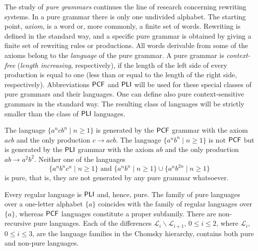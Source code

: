 The study of \emph{pure grammars} continues the line of research concerning rewriting systems. In a pure grammar there is only one undivided alphabet. The starting point, \emph{axiom}, is a word or, more commonly, a finite set of words. Rewriting is defined in the standard way, and a specific pure grammar is obtained by giving a finite set of rewriting rules or productions. All words derivable from some of the axioms belong to the \emph{language} of the pure grammar. A pure grammar is \emph{context-free} (\emph{length increasing}, respectively), if the length of the left side of every production is equal to one (less than or equal to the length of the right side, respectively). Abbreviations \index{$\PCF$}$\PCF$ and \index{$\PLI$}$\PLI$ will be used for these special classes of pure grammars and their languages. One can define also  pure context-sensitive grammars in the standard way. The resulting class of languages will be strictly smaller than the class of $\PLI$ languages.

The language $\{a^n c b^n \mid n \ge 1\}$ is generated by the $\PCF$ grammar with the axiom $acb$ and the only production $c \to acb$. The language $\{a^n b^n \mid n \ge 1\}$ is not $\PCF$ but is generated by the $\PLI$ grammar with the axiom $ab$ and the only production $ab \to a^2 b^2$. Neither one of the languages
$$\{a^n b^n c^n \mid n \ge 1\} \text{ and } \{a^n b^n \mid n \ge 1\} \cup \{a^n b^{2n} \mid n \ge 1\}$$
is pure, that is, they are not generated by any pure grammar whatsoever.

Every regular language is $\PLI$ and, hence, pure. The family of pure languages over a one-letter alphabet $\{a\}$ coincides with the family of regular languages over $\{a\}$, whereas $\PCF$ languages constitute a proper subfamily. There are non-recursive pure languages. Each of the differences $\mathcal{L}_i \backslash \mathcal{L}_{i+1}$, $0 \le i \le 2$, where $\mathcal{L}_i$, $0 \le i \le 3$, are the language families in the Chomsky hierarchy, contains both pure and non-pure languages.

